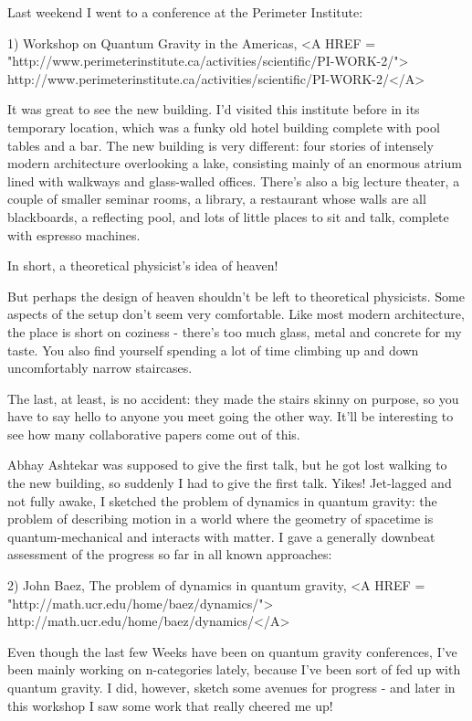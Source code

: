 

Last weekend I went to a conference at the Perimeter Institute:

1) Workshop on Quantum Gravity in the Americas, 
<A HREF = "http://www.perimeterinstitute.ca/activities/scientific/PI-WORK-2/">
http://www.perimeterinstitute.ca/activities/scientific/PI-WORK-2/</A>

It was great to see the new building.  I'd visited this institute
before in its temporary location, which was a funky old hotel 
building complete with pool tables and a bar.    The new building is 
very different: four stories of intensely modern architecture
overlooking a lake, consisting mainly of an enormous atrium lined with 
walkways and glass-walled offices.  There's also a big lecture 
theater, a couple of smaller seminar rooms, a library, a restaurant 
whose walls are all blackboards, a reflecting pool, and lots of 
little places to sit and talk, complete with espresso machines.  

In short, a theoretical physicist's idea of heaven!  

But perhaps the design of heaven shouldn't be left to theoretical
physicists.  Some aspects of the setup don't seem very comfortable.
Like most modern architecture, the place is short on coziness - 
there's too much glass, metal and concrete for my taste.  You 
also find yourself spending a lot of time climbing up and down 
uncomfortably narrow staircases. 

The last, at least, is no accident: they made the stairs skinny on 
purpose, so you have to say hello to anyone you meet going the other 
way.  It'll be interesting to see how many collaborative papers come 
out of this.

Abhay Ashtekar was supposed to give the first talk, but he got lost
walking to the new building, so suddenly I had to give the first talk.
Yikes!    Jet-lagged and not fully awake, I sketched the problem of 
dynamics in quantum gravity: the problem of describing motion in a 
world where the geometry of spacetime is quantum-mechanical and 
interacts with matter.  I gave a generally downbeat assessment of the 
progress so far in all known approaches:

2) John Baez, The problem of dynamics in quantum gravity,
<A HREF = "http://math.ucr.edu/home/baez/dynamics/">
http://math.ucr.edu/home/baez/dynamics/</A>

Even though the last few Weeks have been on quantum gravity conferences,
I've been mainly working on n-categories lately, because I've been sort
of fed up with quantum gravity.  I did, however, sketch some avenues 
for progress - and later in this workshop I saw some work that really
cheered me up!

